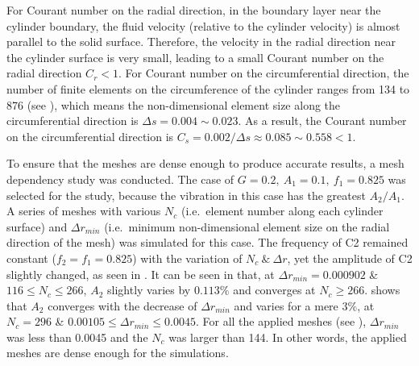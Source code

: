 For Courant number on the radial direction, in the boundary layer near the cylinder boundary, the fluid velocity (relative to the cylinder velocity) is almost parallel to the solid surface. Therefore, the velocity in the radial direction near the cylinder surface is very small, leading to a small Courant number on the radial direction $C_r <1$. For Courant number on the circumferential direction, the number of finite elements on the circumference of the cylinder ranges from 134 to 876 (see ), which means the non-dimensional element size along the circumferential direction is $ \Delta s= 0.004\sim 0.023$. As a result, the Courant number on the circumferential direction is $C_s=0.002/\Delta s \approx 0.085 \sim 0.558 <1$.



To ensure that the meshes are dense enough to produce accurate results, a mesh dependency study was conducted. The case of $ G=0.2,\ A_1=0.1,\ f_1=0.825 $ was selected for the study, because the vibration in this case has the greatest $ A_2/A_1 $. A series of meshes with various $ N_c $ (i.e.\ element number along each cylinder surface) and $ \Delta r_{min} $ (i.e.\ minimum non-dimensional element size on the radial direction of the mesh) was simulated for this case. The frequency of C2 remained constant ($ f_2=f_1=0.825 $) with the variation of $ N_c\ \&\ \Delta r $, yet the amplitude of C2 slightly changed, as seen in . It can be seen in  that, at $ \Delta r_{min} =0.000902 $ \& $ 116 \leq N_c \leq 266 $, $ A_2 $ slightly varies by $ 0.113\% $ and converges at $N_c \geq 266 $.  shows that $ A_2 $ converges with the decrease of $ \Delta r_{min} $ and varies for a mere $ 3\% $, at $ N_c=296 $ \& $ 0.00105\leq \Delta r_{min} \leq 0.0045$. For all the applied meshes (see ), $ \Delta r_{min}$ was less than 0.0045 and the $ N_c $ was larger than 144. In other words, the applied meshes are dense enough for the simulations. 





